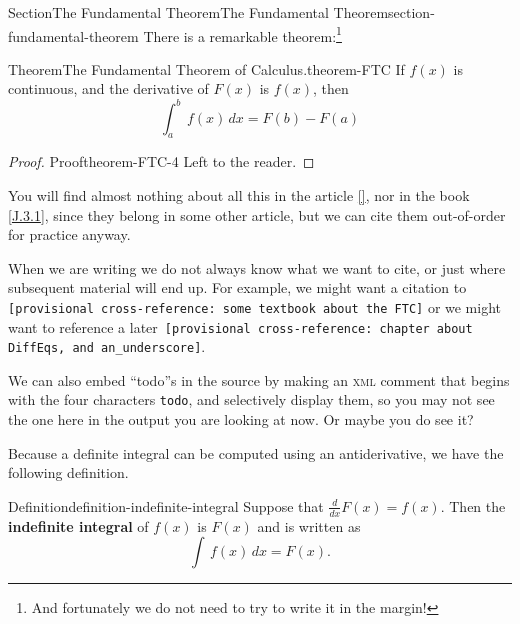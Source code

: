 \documentclass[twoside,10pt,]{article}
\newcommand{\xreffont}{\relax}
\newcommand{\mono}[1]{\texttt{#1}}
\newcommand{\initialism}[1]{\textsc{\MakeLowercase{#1}}}
\newcommand{\terminology}[1]{\textbf{#1}}
\numberwithin{equation}{section}
\newcommand{\definiteintegral}[4]{\int_{#1}^{#2}\,#3\,d#4}
\begin{document}
\begin{sectionptx}{Section}{The Fundamental Theorem}{}{The Fundamental Theorem}{}{}{section-fundamental-theorem}
There is a remarkable theorem:\footnote{And fortunately we do not need to try to write it in the margin!\label{footnote-fermat}}%
\begin{theorem}{Theorem}{The Fundamental Theorem of Calculus.}{}{theorem-FTC}%
%
If \(f(x)\) is continuous, and the derivative of \(F(x)\) is \(f(x)\), then%
\begin{equation*}
\definiteintegral{a}{b}{f(x)}{x}=F(b)-F(a)
\end{equation*}
%
\end{theorem}
\begin{proof}{Proof}{}{theorem-FTC-4}
Left to the reader.%
\end{proof}
You will find almost nothing about all this in the article \hyperlink{biblio-lay-article}{[{\xreffont 2}]}, nor in the book \hyperlink{biblio-judson-AATA}{[{\xreffont J.3.1}]}, since they belong in some other article, but we can cite them out-of-order for practice anyway.%
\par
When we are writing we do not always know what we want to cite, or just where subsequent material will end up.  For example, we might want a citation to \mono{[provisional cross-reference: some textbook about the FTC]} or we might want to reference a later~\mono{[provisional cross-reference: chapter about DiffEq\textquotesingle{}s, and an\_underscore]}.%
\par
We can also embed ``todo''s in the source by making an \initialism{XML} comment that begins with the four characters \mono{todo}, and selectively display them, so you may not see the one here in the output you are looking at now.  Or maybe you do see it?%
\par
Because a definite integral can be computed using an antiderivative, we have the following definition.%
\begin{definition}{Definition}{}{definition-indefinite-integral}%
%
%
\label{definition-indefinite-integral-3}%
Suppose that \(\frac{d}{dx}F(x)=f(x)\).  Then the \terminology{indefinite integral} of \(f(x)\) is \(F(x)\) and is written as%
\begin{equation*}
\int\,f(x)\,dx=F(x)\text{.}
\end{equation*}
%
\end{definition}
\end{sectionptx}
\end{document}
